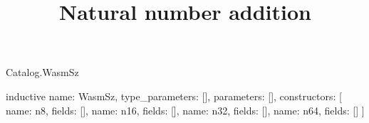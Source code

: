 \begin{lexlean}{Catalog.WasmSz}
\title{Natural number addition}
\begin{semanticmodule}
inductive{
  name: WasmSz,
  type_parameters: [],
  parameters: [],
  constructors: [
    {name: n8, fields: []},
    {name: n16, fields: []},
    {name: n32, fields: []},
    {name: n64, fields: []}
  ]
}
\end{semanticmodule}
\end{lexlean}
